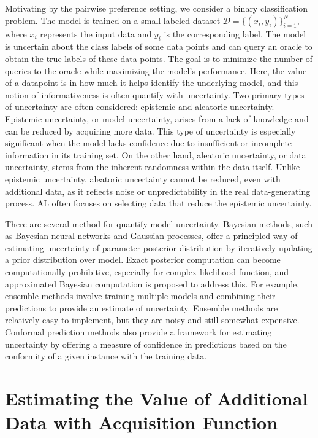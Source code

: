 \documentclass[
  letterpaper,
  numbers=noenddot,
  DIV=11]{scrreprt}
\theoremstyle{plain}
\theoremstyle{definition}
\theoremstyle{remark}
\begin{document}
Motivating by the pairwise preference setting, we consider a binary
classification problem. The model is trained on a small labeled dataset
\(\mathcal{D} = \{(x_i, y_i)\}_{i=1}^N\), where \(x_i\) represents the
input data and \(y_i\) is the corresponding label. The model is
uncertain about the class labels of some data points and can query an
oracle to obtain the true labels of these data points. The goal is to
minimize the number of queries to the oracle while maximizing the
model's performance. Here, the value of a datapoint is in how much it
helps identify the underlying model, and this notion of informativeness
is often quantify with uncertainty. Two primary types of uncertainty are
often considered: epistemic and aleatoric uncertainty. Epistemic
uncertainty, or model uncertainty, arises from a lack of knowledge and
can be reduced by acquiring more data. This type of uncertainty is
especially significant when the model lacks confidence due to
insufficient or incomplete information in its training set. On the other
hand, aleatoric uncertainty, or data uncertainty, stems from the
inherent randomness within the data itself. Unlike epistemic
uncertainty, aleatoric uncertainty cannot be reduced, even with
additional data, as it reflects noise or unpredictability in the real
data-generating process. AL often focuses on selecting data that reduce
the epistemic uncertainty.

There are several method for quantify model uncertainty. Bayesian
methods, such as Bayesian neural networks and Gaussian processes, offer
a principled way of estimating uncertainty of parameter posterior
distribution by iteratively updating a prior distribution over model.
Exact posterior computation can become computationally prohibitive,
especially for complex likelihood function, and approximated Bayesian
computation is proposed to address this. For example, ensemble methods
involve training multiple models and combining their predictions to
provide an estimate of uncertainty. Ensemble methods are relatively easy
to implement, but they are noisy and still somewhat expensive. Conformal
prediction methods also provide a framework for estimating uncertainty
by offering a measure of confidence in predictions based on the
conformity of a given instance with the training data.

\section{Estimating the Value of Additional Data with Acquisition
Function}\label{estimating-the-value-of-additional-data-with-acquisition-function}
\end{document}
